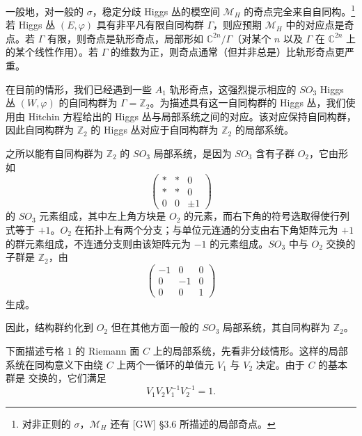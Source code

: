 \documentclass[11pt,a4paper]{article}
\begin{document}
一般地，对一般的 $\sigma$，稳定分歧 Higgs 丛的模空间 $\mathcal{M}_H$ 的奇点完全来自自同构。\footnote{对非正则的 $\sigma$，$\mathcal{M}_H$ 还有 [GW] §3.6 所描述的局部奇点。} 若 Higgs 丛 $(E,\varphi)$ 具有非平凡有限自同构群 $\Gamma$，则应预期 $\mathcal{M}_H$ 中的对应点是奇点。若 $\Gamma$ 有限，则奇点是轨形奇点，局部形如 $\mathbb{C}^{2n}/\Gamma$（对某个 $n$ 以及 $\Gamma$ 在 $\mathbb{C}^{2n}$ 上的某个线性作用）。若 $\Gamma$ 的维数为正，则奇点通常（但并非总是）比轨形奇点更严重。

在目前的情形，我们已经遇到一些 $A_1$ 轨形奇点，这强烈提示相应的 $SO_3$ Higgs 丛 $(W,\varphi)$ 的自同构群为 $\Gamma=\mathbb{Z}_2$。为描述具有这一自同构群的 Higgs 丛，我们使用由 Hitchin 方程给出的 Higgs 丛与局部系统之间的对应。该对应保持自同构群，因此自同构群为 $\mathbb{Z}_2$ 的 Higgs 丛对应于自同构群为 $\mathbb{Z}_2$ 的局部系统。

之所以能有自同构群为 $\mathbb{Z}_2$ 的 $SO_3$ 局部系统，是因为 $SO_3$ 含有子群 $O_2$，它由形如
\begin{equation}\tag{3.21}
\begin{pmatrix}
* & * & 0\\
* & * & 0\\
0 & 0 & \pm1
\end{pmatrix}
\end{equation}
的 $SO_3$ 元素组成，其中左上角方块是 $O_2$ 的元素，而右下角的符号选取得使行列式等于 $+1$。$O_2$ 在拓扑上有两个分支；与单位元连通的分支由右下角矩阵元为 $+1$ 的群元素组成，不连通分支则由该矩阵元为 $-1$ 的元素组成。$SO_3$ 中与 $O_2$ 交换的子群是 $\mathbb{Z}_2$，由
\begin{equation}\tag{3.22}
\begin{pmatrix}
-1 & 0 & 0\\
0 & -1 & 0\\
0 & 0 & 1
\end{pmatrix}
\end{equation}
生成。

因此，结构群约化到 $O_2$ 但在其他方面一般的 $SO_3$ 局部系统，其自同构群为 $\mathbb{Z}_2$。

下面描述亏格 $1$ 的 Riemann 面 $C$ 上的局部系统，先看非分歧情形。这样的局部系统在同构意义下由绕 $C$ 上两个一循环的单值元 $V_1$ 与 $V_2$ 决定。由于 $C$ 的基本群是
交换的，它们满足
\begin{equation}\tag{3.23}
V_1V_2V_1^{-1}V_2^{-1}=1.
\end{equation}
\end{document}
